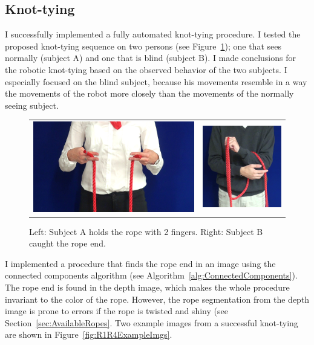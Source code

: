     \subsection{Knot-tying}
        I successfully implemented a fully automated knot-tying procedure. I tested the proposed knot-tying sequence on two persons (see Figure~\ref{fig:ABExamples}); one that sees normally (subject A) and one that is blind (subject B). I made conclusions for the robotic knot-tying based on the observed behavior of the two subjects. I especially focused on the blind subject, because his movements resemble in a way the movements of the  \CloPeMa\/ robot more closely than the movements of the normally seeing subject.

        \begin{figure}[h]
            \centering
            \begin{tabular}{cc}
            \includegraphics[height=0.3\textwidth]{Img/tyer/ATwoFingers.png}
            &
            \includegraphics[height=0.3\textwidth]{Img/tyer/BLookingForRopeEnd.png}
            \end{tabular}
            \caption{Left: Subject A holds the rope with 2 fingers. Right: Subject B caught the rope end.}
            \label{fig:ABExamples}
        \end{figure}

        I implemented a procedure that finds the rope end in an image using the connected components algorithm (see Algorithm~\ref{alg:ConnectedComponents}). The rope end is found in the depth image, which makes the whole procedure invariant to the color of the rope. However, the rope segmentation from the depth image is prone to errors if the rope is twisted and shiny (see Section~\ref{sec:AvailableRopes}. Two example images from a successful knot-tying are shown in Figure~\ref{fig:R1R4ExampleImgs}.

